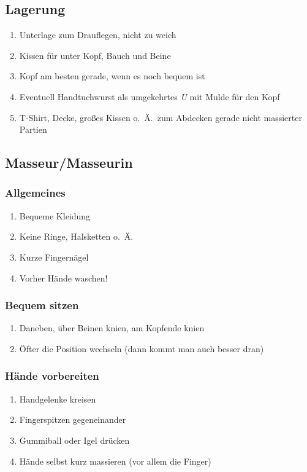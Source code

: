 \subsection{Lagerung}
\begin{enumerate}
\item Unterlage zum Drauflegen, nicht zu weich
\item Kissen für unter Kopf, Bauch und Beine
\item Kopf am besten gerade, wenn es noch bequem ist
\item Eventuell Handtuchwurst als umgekehrtes \emph{U} mit Mulde für den Kopf
\item T-Shirt, Decke, großes Kissen o.~Ä.~zum Abdecken gerade nicht massierter Partien
\end{enumerate}

\subsection{Masseur/Masseurin}

\subsubsection{Allgemeines}
\begin{enumerate}
\item Bequeme Kleidung
\item Keine Ringe, Halsketten o.~Ä.
\item Kurze Fingernägel
\item Vorher Hände waschen!
\end{enumerate}

\subsubsection{Bequem sitzen}
\begin{enumerate}
\item Daneben, über Beinen knien, am Kopfende knien
\item Öfter die Position wechseln (dann kommt man auch besser dran)
\end{enumerate}

\subsubsection{Hände vorbereiten}
\begin{enumerate}
\item Handgelenke kreisen
\item Fingerspitzen gegeneinander
\item Gummiball oder Igel drücken
\item Hände selbst kurz massieren (vor allem die Finger)
\end{enumerate}

